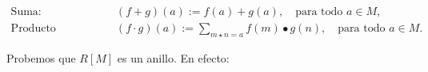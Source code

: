 \begin{align*}
	\text{Suma:} \quad & (f + g)(a) := f(a) + g(a), \quad \text{para todo } a \in M, \\[8pt]
	\text{Producto (convolución):} \quad & (f\cdot g)(a) := \sum_{m \star n = a} f(m) \bullet g(n), \quad \text{para todo } a \in M.
\end{align*}
\begin{observacion}
\end{observacion}

Probemos que \( R[M] \) es un anillo. En efecto:



